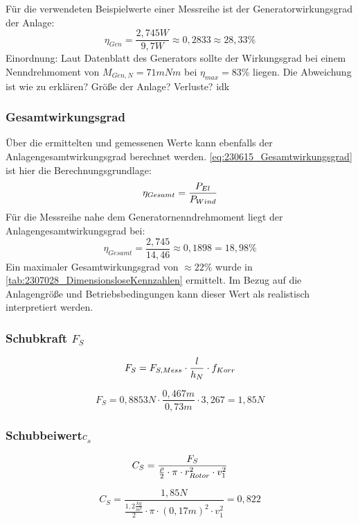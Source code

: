 Für die verwendeten Beispielwerte einer Messreihe ist der Generatorwirkungsgrad der Anlage:
$$\eta_{Gen} = \frac{2,745W}{9,7W} \approx 0,2833 \approx 28,33\% $$
Einordnung:
Laut Datenblatt des Generators sollte der Wirkungsgrad bei einem Nenndrehmoment von $M_{Gen,N}= 71 mNm$ bei $\eta_{max}=83\%$ liegen.
Die Abweichung ist wie zu erklären? Größe der Anlage? Verluste? idk
\subsubsection*{Gesamtwirkungsgrad}
Über die ermittelten und gemessenen Werte kann ebenfalls der Anlagengesamtwirkungsgrad berechnet werden.
\autoref{eq:230615_Gesamtwirkungsgrad} ist hier die Berechnungsgrundlage:
\begin{equation}
    \centering
    \eta_{Gesamt} = \frac{P_{El}}{P_{Wind}}
    \label{eq:230615_Gesamtwirkungsgrad}
\end{equation}
Für die Messreihe nahe dem Generatornenndrehmoment liegt der Anlagengesamtwirkungsgrad bei:
$$\eta_{Gesamt} = \frac{2,745}{14,46}\approx 0,1898 = 18,98\%$$
Ein maximaler Gesamtwirkungsgrad von $\approx 22\%$ wurde in \autoref{tab:2307028_DimensionsloseKennzahlen} ermittelt.
Im Bezug auf die Anlagengröße und Betriebsbedingungen kann dieser Wert als realistisch interpretiert werden.
\subsubsection*{Schubkraft $F_S$}
\begin{equation}
    \centering
    F_S = F_{S,Mess} \cdot \frac{l}{h_N} \cdot f_{Korr}
    \label{eq:230615_Schubkraft}
\end{equation}

$$F_S = 0,8853N \cdot \frac{0,467m}{0,73m} \cdot 3,267 = 1,85N$$
\subsubsection*{Schubbeiwert$c_s$}
\begin{equation}
    \centering
    C_S = \frac{F_S}{\frac{\rho}{2} \cdot \pi \cdot r_{Rotor}^2 \cdot v_1^2}
    \label{eq:230615_Schubbeiwert}
\end{equation}

$$C_S = \frac{1,85N}{\frac{1,2 \frac{kg}{m^3}}{2} \cdot \pi \cdot (0,17 m)^2 \cdot v_1^2} = 0,822$$

